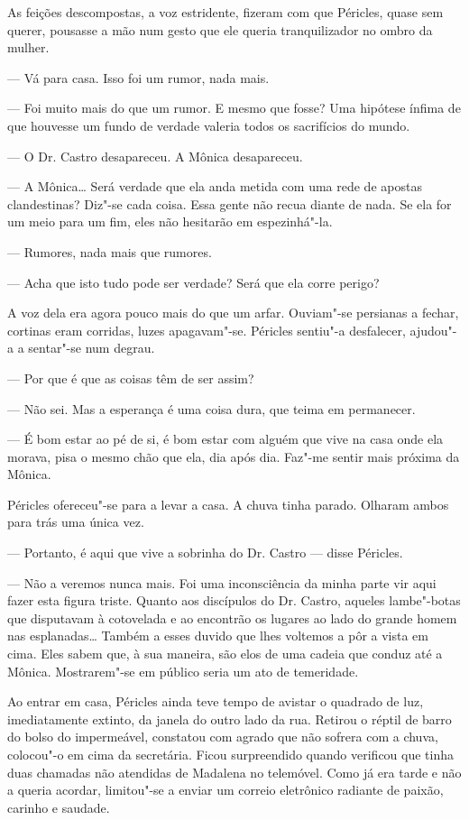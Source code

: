 As feições descompostas, a voz estridente, fizeram com que Péricles,
quase sem querer, pousasse a mão num gesto que ele queria tranquilizador
no ombro da mulher.

--- Vá para casa. Isso foi um rumor, nada mais.

--- Foi muito mais do que um rumor. E mesmo que fosse? Uma hipótese ínfima
  de que houvesse um fundo de verdade valeria todos os sacrifícios do
  mundo.

--- O Dr. Castro desapareceu. A Mônica desapareceu.

--- A Mônica\ldots{} Será verdade que ela anda metida com uma rede de apostas
  clandestinas? Diz"-se cada coisa. Essa gente não recua diante de
  nada. Se ela for um meio para um fim, eles não hesitarão em
  espezinhá"-la.

--- Rumores, nada mais que rumores.

--- Acha que isto tudo pode ser verdade? Será que ela corre perigo?


A voz dela era agora pouco mais do que um arfar. Ouviam"-se persianas a fechar, cortinas eram corridas, luzes apagavam"-se.
Péricles sentiu"-a desfalecer, ajudou"-a a sentar"-se num degrau.

--- Por que é que as coisas têm de ser assim?

--- Não sei. Mas a esperança é uma coisa dura, que teima em permanecer.

--- É bom estar ao pé de si, é bom estar com alguém que vive na casa onde
  ela morava, pisa o mesmo chão que ela, dia após dia. Faz"-me sentir
  mais próxima da Mônica.

Péricles ofereceu"-se para a levar a casa. A chuva tinha parado. Olharam
ambos para trás uma única vez.

--- Portanto, é aqui que vive a sobrinha do Dr. Castro --- disse Péricles.

--- Não a veremos nunca mais. Foi uma inconsciência da minha parte vir
  aqui fazer esta figura triste. Quanto aos discípulos do Dr. Castro,
  aqueles lambe"-botas que disputavam à cotovelada e ao encontrão os
  lugares ao lado do grande homem nas esplanadas\ldots{} Também a esses
  duvido que lhes voltemos a pôr a vista em cima. Eles sabem que, à sua
  maneira, são elos de uma cadeia que conduz até a Mônica. Mostrarem"-se
  em público seria um ato de temeridade.


Ao entrar em casa, Péricles ainda teve tempo de avistar o quadrado de
luz, imediatamente extinto, da janela do outro lado da rua. Retirou o
réptil de barro do bolso do impermeável, constatou com agrado que não
sofrera com a chuva, colocou"-o em cima da secretária. Ficou surpreendido
quando verificou que tinha duas chamadas não atendidas de Madalena no
telemóvel. Como já era tarde e não a queria acordar, limitou"-se a enviar
um correio eletrônico radiante de paixão, carinho e saudade.

